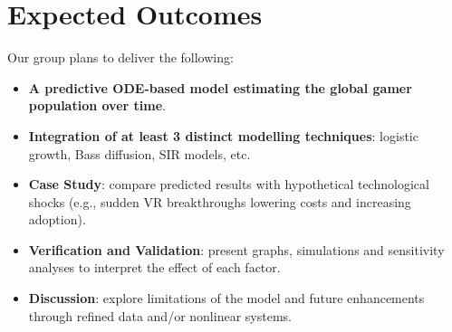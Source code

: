 \documentclass{article}
\begin{document}
\section{Expected Outcomes}
Our group plans to deliver the following: 
\begin{itemize} [nosep]
    \item \textbf{A predictive ODE-based model estimating the global gamer population over time}.
    \item \textbf{Integration of at least 3 distinct modelling techniques}: logistic growth, Bass diffusion, SIR models, etc. 
    \item \textbf{Case Study}: compare predicted results with hypothetical technological shocks (e.g., sudden VR breakthroughs lowering costs and increasing adoption).
    \item \textbf{Verification and Validation}: present graphs, simulations and sensitivity analyses to interpret the effect of each factor.
    \item \textbf{Discussion}: explore limitations of the model and future enhancements through refined data and/or nonlinear systems.

\end{itemize}



\end{document}
